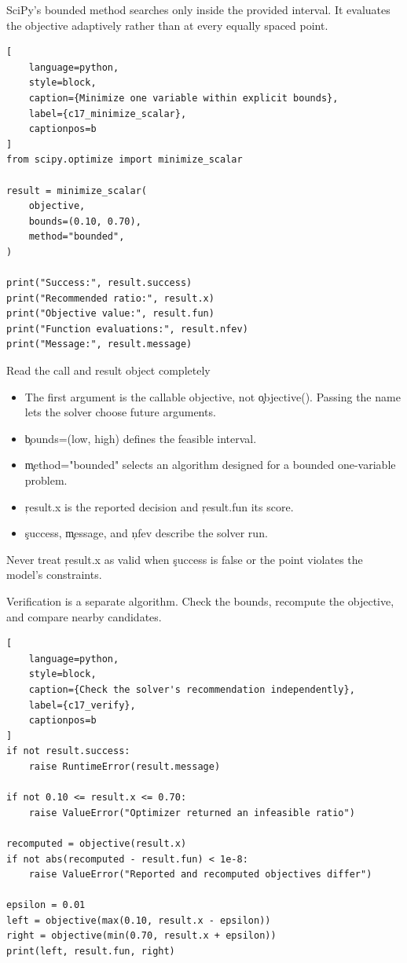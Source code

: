
SciPy's bounded method searches only inside the provided interval. It evaluates
the objective adaptively rather than at every equally spaced point.

\begin{lstlisting}[
    language=python,
    style=block,
    caption={Minimize one variable within explicit bounds},
    label={c17_minimize_scalar},
    captionpos=b
]
from scipy.optimize import minimize_scalar

result = minimize_scalar(
    objective,
    bounds=(0.10, 0.70),
    method="bounded",
)

print("Success:", result.success)
print("Recommended ratio:", result.x)
print("Objective value:", result.fun)
print("Function evaluations:", result.nfev)
print("Message:", result.message)
\end{lstlisting}

\begin{SyntaxBox}{Read the call and result object completely}
\begin{itemize}
    \item The first argument is the callable objective, not \c{objective()}.
          Passing the name lets the solver choose future arguments.
    \item \c{bounds=(low, high)} defines the feasible interval.
    \item \c{method="bounded"} selects an algorithm designed for a bounded
          one-variable problem.
    \item \c{result.x} is the reported decision and \c{result.fun} its score.
    \item \c{success}, \c{message}, and \c{nfev} describe the solver run.
\end{itemize}
Never treat \c{result.x} as valid when \c{success} is false or the point violates
the model's constraints.
\end{SyntaxBox}


Verification is a separate algorithm. Check the bounds, recompute the objective,
and compare nearby candidates.

\begin{lstlisting}[
    language=python,
    style=block,
    caption={Check the solver's recommendation independently},
    label={c17_verify},
    captionpos=b
]
if not result.success:
    raise RuntimeError(result.message)

if not 0.10 <= result.x <= 0.70:
    raise ValueError("Optimizer returned an infeasible ratio")

recomputed = objective(result.x)
if not abs(recomputed - result.fun) < 1e-8:
    raise ValueError("Reported and recomputed objectives differ")

epsilon = 0.01
left = objective(max(0.10, result.x - epsilon))
right = objective(min(0.70, result.x + epsilon))
print(left, result.fun, right)
\end{lstlisting}

